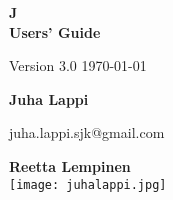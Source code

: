 \documentclass{ol-softwaremanual}
\date{\displaydate{date}}
\begin{document}
\begin{titlepage}
   \begin{center}
\Huge
\textbf{J}\\
       \textbf{Users' Guide}

       \vspace{0.5cm}
       \Large
        Version 3.0 \hspace{0.5cm} \today
            
       \vspace{1cm}
\huge
       \textbf{Juha Lappi }
        \vspace{0.3cm}
       
  \normalsize
    juha.lappi.sjk@gmail.com
    
    \vspace{0.1cm}
 
 \huge   
    
       \textbf{ Reetta Lempinen}\\
\vspace{1cm}
      \normalsize
     \vspace{1cm}
       \texttt{[image: juhalappi.jpg]}
    
            
   \end{center}
\end{titlepage}

\addtolength{\cftsecnumwidth}{5pt}
\addtolength{\cftsubsecnumwidth}{10pt}
\addtolength{\cftsubsubsecnumwidth}{15pt}
\tableofcontents
\newpage



\printbibliography
\printindex
\end{document}
